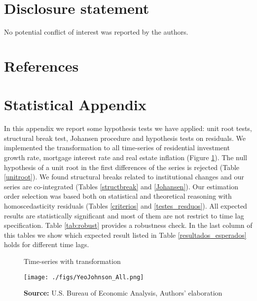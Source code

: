 \documentclass[12pt, a4paper]{article}
\begin{document}
\section*{Disclosure statement}
\label{sec:orga8c4875}
No potential conflict of interest was reported by the authors.

\section*{References}
\label{sec:orgd43f364}
\printbibliography[heading=none]


\appendix
\section{Statistical Appendix}
\label{sec:org762f149}
\label{appen:A}

In this appendix we report some hypothesis tests we have applied: unit root tests, structural break test, Johansen procedure and hypothesis tests on residuals.
We implemented the \textcite{yeo_new_2000} transformation to all time-series of residential investment growth rate, mortgage interest
rate and real estate inflation (Figure \ref{YeoJhonson}).
The null hypothesis of a unit root in the first differences of the series is rejected (Table \ref{unitroot}).
We found structural breaks related to institutional changes and our series are co-integrated (Tables \ref{structbreak} and \ref{Johansen}).
Our estimation order selection was based both on statistical and theoretical reasoning with homoscedasticity residuals (Tables \ref{criterios} and \ref{testes_resduos}).
All expected results are statistically significant and most of them are not restrict to time lag specification.
Table \ref{tab:robust} provides a robustness check.
In the last column of this tables we show which expected result listed in Table \ref{resultados_esperados} holds for different time lags.

\begin{figure}[htb]
	\centering
	\caption{Time-series with \textcite{yeo_new_2000} transformation}
	\label{YeoJhonson}
	\texttt{[image: ./figs/YeoJohnson\_All.png]}
	\caption*{\textbf{Source:} U.S. Bureau of Economic Analysis, Authors' elaboration}
\end{figure}






\end{document}
